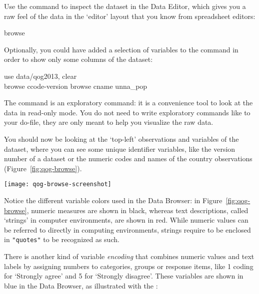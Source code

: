 	 Use the  command to inspect the dataset in the Data Editor, which gives you a raw feel of the data in the `editor' layout that you know from spreadsheet editors:%

		\begin{docspec}
			browse
		\end{docspec}

  Optionally, you could have added a selection of variables to the  command in order to show only some columns of the dataset:\\[1em]%

		\begin{docspec}
			use data/qog2013, clear\\
			browse ccode-version
      browse cname unna\_pop
		\end{docspec}

	The  command is an exploratory command: it is a convenience tool to look at the data in read-only mode. You do not need to write exploratory commands like  to your do-file, they are only meant to help you visualize the raw data.%
  	
  You should now be looking at the `top-left' observations and variables of the \QOG dataset, where you can see some unique identifier variables, like the version number of a dataset or the numeric codes and names of the country observations (Figure~\ref{fig:qog-browse}).%

		\begin{figure*}[h]
			\texttt{[image: qog-browse-screenshot]}%
		  \caption{The Stata Data Browser, showing \QOG data.}%
		  \label{fig:qog-browse}%
		\end{figure*}

	Notice the different variable colors used in the Data Browser: in Figure~\ref{fig:qog-browse}, numeric measures are shown in black, whereas text descriptions, called `strings' in computer environments, are shown in red. While numeric values can be referred to directly in computing environments, strings require to be enclosed in \texttt{"quotes"} to be recognized as such.%
		
	There is another kind of variable \emph{encoding} that combines numeric values and text labels by assigning numbers to categories, groups or response items, like 1 coding for `Strongly agree' and 5 for `Strongly disagree'. These variables are shown in blue in the Data Browser, as illustrated with the \gss:\\[1em]%

